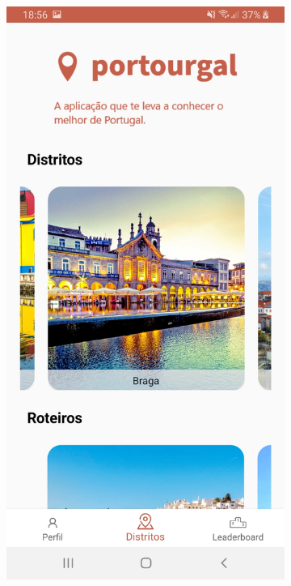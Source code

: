 \begin{figure}[H]
    \centering
    \begin{subfigure}{.5\textwidth}
        \centering
        \includegraphics[width=0.9\linewidth]{images/distritos.jpg}
    \end{subfigure}%
    \begin{subfigure}{.5\textwidth}
        \centering

\end{subfigure}
\end{figure}
